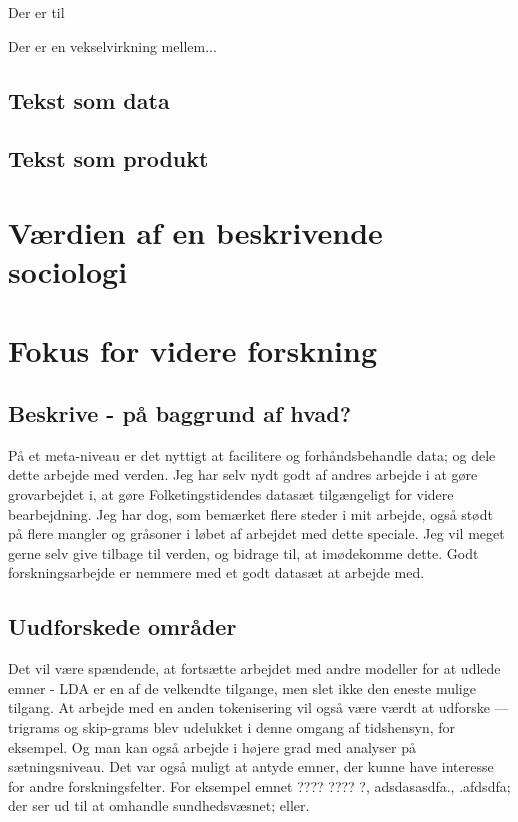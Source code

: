 Der er til

Der er en vekselvirkning mellem...

\section{Tekst som data}

\section{Tekst som produkt}

\chapter{Værdien af en beskrivende sociologi}

\chapter{Fokus for videre forskning}

\section{Beskrive - på baggrund af hvad?}
På et meta-niveau er det nyttigt at facilitere og forhåndsbehandle data; og dele dette arbejde med verden.
Jeg har selv nydt godt af andres arbejde i at gøre grovarbejdet i, at gøre Folketingstidendes datasæt tilgængeligt for videre bearbejdning.
Jeg har dog, som bemærket flere steder i mit arbejde, også stødt på flere mangler og gråsoner i løbet af arbejdet med dette speciale.
Jeg vil meget gerne selv give tilbage til verden, og bidrage til, at imødekomme dette.
Godt forskningsarbejde er nemmere med et godt datasæt at arbejde med.

\section{Uudforskede områder}

Det vil være spændende, at fortsætte arbejdet med andre modeller for at udlede emner - LDA er en af de velkendte tilgange, men slet ikke den eneste mulige tilgang.
At arbejde med en anden tokenisering vil også være værdt at udforske — trigrams og skip-grams blev udelukket i denne omgang af tidshensyn, for eksempel. Og man kan også arbejde i højere grad med analyser på sætningsniveau.
Det var også muligt at antyde emner, der kunne have interesse for andre forskningsfelter.
For eksempel emnet ???? ???? ?, adsdasasdfa., .afdsdfa; der ser ud til at omhandle sundhedsvæsnet; eller.
